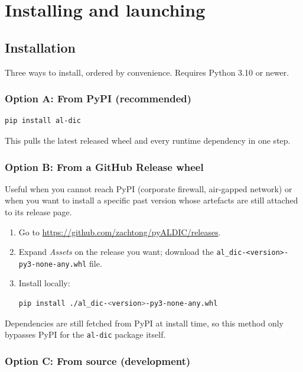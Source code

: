 \section{Installing and launching}
\label{sec:launching}

\subsection{Installation}

Three ways to install, ordered by convenience. Requires
Python 3.10 or newer.

\subsubsection*{Option A: From PyPI (recommended)}

\begin{lstlisting}[language=bash]
pip install al-dic
\end{lstlisting}

This pulls the latest released wheel and every runtime dependency
in one step.

\subsubsection*{Option B: From a GitHub Release wheel}

Useful when you cannot reach PyPI (corporate firewall, air-gapped
network) or when you want to install a specific past version whose
artefacts are still attached to its release page.

\begin{enumerate}
  \item Go to \url{https://github.com/zachtong/pyALDIC/releases}.
  \item Expand \emph{Assets} on the release you want; download the
    \texttt{al\_dic-<version>-py3-none-any.whl} file.
  \item Install locally:
\begin{lstlisting}[language=bash]
pip install ./al_dic-<version>-py3-none-any.whl
\end{lstlisting}
\end{enumerate}

Dependencies are still fetched from PyPI at install time, so this
method only bypasses PyPI for the \texttt{al-dic} package itself.

\subsubsection*{Option C: From source (development)}

